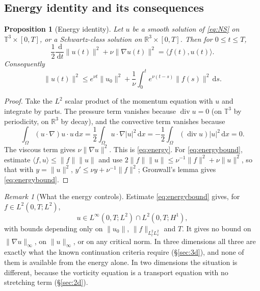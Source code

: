 \documentclass[11pt]{article}
\newtheorem{proposition}[theorem]{Proposition}
\theoremstyle{remark}
\newtheorem{remark}[theorem]{Remark}
\newcommand{\R}{\mathbb{R}}
\newcommand{\T}{\mathbb{T}}
\newcommand{\dd}{\,\mathrm{d}}
\newcommand{\norm}[1]{\lVert #1\rVert}
\newcommand{\abs}[1]{\lvert #1\rvert}
\newcommand{\ip}[2]{\langle #1,#2\rangle}
\newcommand{\Div}{\operatorname{div}}
\begin{document}
\subsection{Energy identity and its consequences}

\begin{proposition}[Energy identity]\label{prop:energy}
Let $u$ be a smooth solution of \eqref{eq:NS} on $\T^3\times[0,T]$, or a Schwartz-class
solution on $\R^3\times[0,T]$. Then for $0\le t\le T$,
\begin{equation}\label{eq:energy}
\frac12\frac{\dd}{\dd t}\norm{u(t)}^2+\nu\norm{\nabla u(t)}^2=\ip{f(t)}{u(t)}.
\end{equation}
Consequently
\begin{equation}\label{eq:energybound}
\norm{u(t)}^2\le e^{\nu t}\norm{u_0}^2+\frac1\nu\int_0^te^{\nu(t-s)}\norm{f(s)}^2\dd s .
\end{equation}
\end{proposition}

\begin{proof}
Take the $L^2$ scalar product of the momentum equation with $u$ and integrate by parts. The
pressure term vanishes because $\Div u=0$ (on $\T^3$ by periodicity, on $\R^3$ by decay), and
the convective term vanishes because
\[
\int_\Omega (u\cdot\nabla)u\cdot u\dd x
=\frac12\int_\Omega u\cdot\nabla\abs{u}^2\dd x
=-\frac12\int_\Omega(\Div u)\abs{u}^2\dd x=0 .
\]
The viscous term gives $\nu\norm{\nabla u}^2$. This is \eqref{eq:energy}. For
\eqref{eq:energybound}, estimate $\ip{f}{u}\le\norm{f}\norm{u}$ and use
$2\norm{f}\norm{u}\le\nu^{-1}\norm{f}^2+\nu\norm{u}^2$, so that with $y=\norm{u}^2$,
$y'\le\nu y+\nu^{-1}\norm{f}^2$; Gronwall's lemma gives \eqref{eq:energybound}.
\end{proof}

\begin{remark}[What the energy controls]\label{rem:energy}
Estimate \eqref{eq:energybound} gives, for $f\in L^2(0,T;L^2)$,
\[
u\in L^\infty(0,T;L^2)\cap L^2(0,T;H^1),
\]
with bounds depending only on $\norm{u_0}$, $\norm{f}_{L^2_tL^2_x}$ and $T$. It gives no
bound on $\norm{\nabla u}_\infty$, on $\norm{u}_\infty$, or on any critical norm. In three
dimensions all three are exactly what the known continuation criteria require
(\S\ref{sec:3d}), and none of them is available from the energy alone. In two dimensions the
situation is different, because the vorticity equation is a transport equation with no
stretching term (\S\ref{sec:2d}).
\end{remark}
\end{document}
